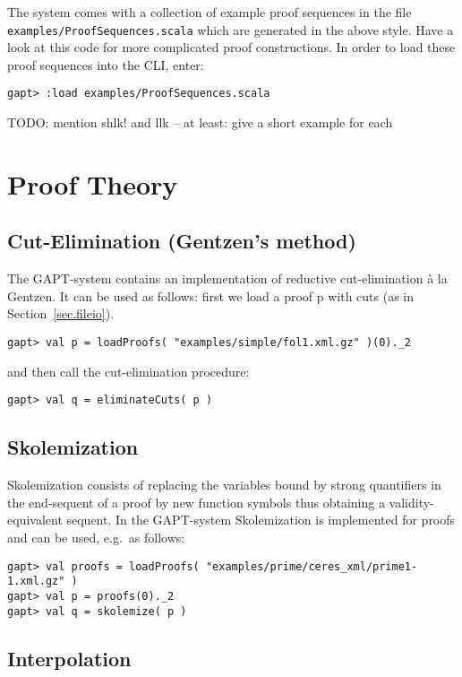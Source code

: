 \documentclass[a4paper,11pt]{article}
\newcommand{\cli}[1]{{\tt {#1}}}
\begin{document}
The system comes with a collection of example proof sequences in the file
\cli{examples/ProofSequences.scala} which are generated in the above style.
Have a look at this code for more complicated proof constructions. In order
to load these proof sequences into the CLI, enter:
\begin{lstlisting}
gapt> :load examples/ProofSequences.scala
\end{lstlisting}

\begin{meta}
TODO: mention shlk! and llk -- at least: give a short example for each
\end{meta}


\section{Proof Theory}

\subsection{Cut-Elimination (Gentzen's method)}

The GAPT-system contains an implementation of reductive cut-elimination
\`{a} la Gentzen. It can be used as follows: first we load a proof p
with cuts (as in Section~\ref{sec.fileio}).
%
\begin{lstlisting}
gapt> val p = loadProofs( "examples/simple/fol1.xml.gz" )(0)._2
\end{lstlisting}
%
and then call the cut-elimination procedure:
\begin{lstlisting}
gapt> val q = eliminateCuts( p )
\end{lstlisting}


\subsection{Skolemization}

Skolemization consists of replacing the variables bound by strong quantifiers in the end-sequent of a proof
by new function symbols thus obtaining a validity-equivalent sequent. In the GAPT-system Skolemization
is implemented for proofs and can be used, e.g.~as follows:
%
\begin{lstlisting}
gapt> val proofs = loadProofs( "examples/prime/ceres_xml/prime1-1.xml.gz" )
gapt> val p = proofs(0)._2
gapt> val q = skolemize( p )
\end{lstlisting}


\subsection{Interpolation}
\end{document}
